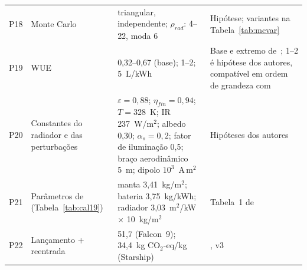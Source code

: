 \documentclass[11pt,a4paper]{article}
\newcommand{\COeq}{\ensuremath{\mathrm{CO_2}\text{-eq}}}
\begin{document}
\begin{longtable}{@{}p{}p{}p{}p{}@{}}
P18 & Monte Carlo & triangular, independente; $\rho_{rad}$: 4--22, moda 6 & Hipótese; variantes na Tabela~\ref{tab:mcvar}\\
P19 & WUE & 0,32--0,67 (base); 1--2; 5~L/kWh & Base e extremo de~\cite{r8}; 1--2 é hipótese dos autores, compatível em ordem de grandeza com~\cite{r22,r5}\\
P20 & Constantes do radiador e das perturbações & $\varepsilon=0{,}88$; $\eta_{fin}=0{,}94$; $T=328$~K; IR 237~W/m$^2$; albedo 0,30; $\alpha_s=0{,}2$; fator de iluminação 0,5; braço aerodinâmico 5~m; dipolo $10^{3}$~A\,m$^2$ & Hipóteses dos autores\\
P21 & Parâmetros de~\cite{r19} (Tabela~\ref{tab:cal19}) & manta 3,41~kg/m$^2$; bateria 3,75~kg/kWh; radiador 3,03~m$^2$/kW $\times$ 10~kg/m$^2$ & Tabela~1 de~\cite{r19}\\
P22 & Lançamento + reentrada & 51,7 (Falcon~9); 34,4~kg $\COeq$/kg (Starship) & \cite{r18}, v3\\
\end{longtable}
\end{document}
